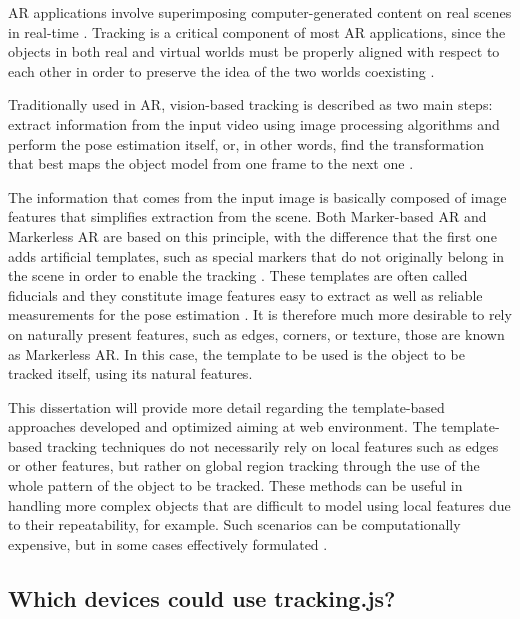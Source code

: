 AR applications involve superimposing computer-generated content on real scenes in real-time \cite{Azuma1997}. Tracking is a critical component of most AR applications, since the objects in both real and virtual worlds must be properly aligned with respect to each other in order to preserve the idea of the two worlds coexisting \cite{Zhou2008}.

Traditionally used in AR, vision-based tracking is described as two main steps: extract information from the input video using image processing algorithms and perform the pose estimation itself, or, in other words, find the transformation that best maps the object model from one frame to the next one \cite{Joma2013}.

The information that comes from the input image is basically composed of image features that simplifies extraction from the scene. Both Marker-based AR and Markerless AR \cite{Lima2009a} are based on this principle, with the difference that the first one adds artificial templates, such as special markers that do not originally belong in the scene in order to enable the tracking \cite{Joma2013}. These templates are often called fiducials and they constitute image features easy to extract as well as reliable measurements for the pose estimation \cite{Cho1998,Lepetit2005}. It is therefore much more desirable to rely on naturally present features, such as edges, corners, or texture, those are known as Markerless AR. In this case, the template to be used is the object to be tracked itself, using its natural features.

This dissertation will provide more detail regarding the template-based approaches developed and optimized aiming at web environment.
The template-based tracking techniques do not necessarily rely on local features such as edges or other features, but rather on global region tracking through the use of the whole pattern of the object to be tracked. These methods can be useful in handling more complex objects that are difficult to model using local features due to their repeatability, for example. Such scenarios can be computationally expensive, but in some cases effectively formulated \cite{Yilmaz2006}.


\subsection{Which devices could use tracking.js?} %
\label{sub:basic_concepts:visual_tracking:which_devices_could_use_trackingjs}


